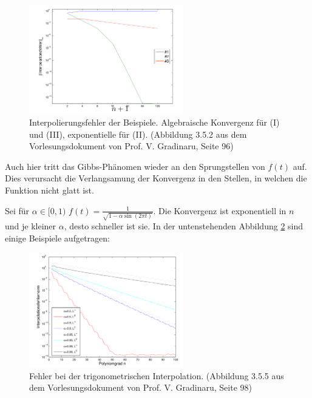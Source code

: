 \begin{figure}[h!]
    \begin{center}
        \includegraphics[width=0.6\textwidth]{assets/01_interpolation/01_trigonometric/interpolation-error-examples.png}
    \end{center}
    \caption{Interpolierungsfehler der Beispiele. Algebraische Konvergenz für (I) und (III), exponentielle für (II).
    (Abbildung 3.5.2 aus dem Vorlesungsdokument von Prof. V. Gradinaru, Seite 96)}
    \label{fig:interpolation-error-examples}
\end{figure}
Auch hier tritt das Gibbs-Phänomen wieder an den Sprungstellen von $f(t)$ auf.
Dies verursacht die Verlangsamung der Konvergenz in den Stellen, in welchen die Funktion nicht glatt ist.

\newpage
{}
\inlineex Sei für $\alpha \in [0, 1)$ $\displaystyle f(t) = \frac{1}{\sqrt{1 - \alpha \sin(2\pi t)}}$.
Die Konvergenz ist exponentiell in $n$ und je kleiner $\alpha$, desto schneller ist sie.
In der untenstehenden Abbildung \ref{fig:interpolation-error-convergence} sind einige Beispiele aufgetragen:
\begin{figure}[h!]
    \begin{center}
        \includegraphics[width=0.6\textwidth]{assets/01_interpolation/01_trigonometric/interpolation-error-convergence.png}
    \end{center}
    \caption{Fehler bei der trigonometrischen Interpolation.
    (Abbildung 3.5.5 aus dem Vorlesungsdokument von Prof. V. Gradinaru, Seite 98)}
    \label{fig:interpolation-error-convergence}
\end{figure}


